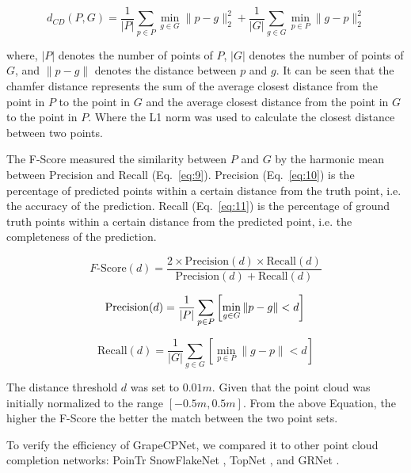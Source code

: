 \documentclass[12pt]{article}
\begin{document}
\begin{equation}
    d_{CD}(P, G) = \frac{1}{|P|} \sum_{p \in P} \min_{g \in G} \|p - g\|_2^2 + \frac{1}{|G|} \sum_{g \in G} \min_{p \in P} \|g - p\|_2^2
    \label{eq:8}
\end{equation}

{\raggedright where, $|P|$ denotes the number of points of $P$, $|G|$ denotes the number of points of $G$, and $\|p - g\|$ denotes the distance between $p$ and $g$. 
It can be seen that the chamfer distance represents the sum of the average closest distance from the point in $P$ to the point in $G$ and the average closest distance from the point in $G$ to the point in $P$. Where the L1 norm was used to calculate the closest distance between two points.}

The F-Score measured the similarity between $P$ and $G$ by the harmonic mean between Precision and Recall (Eq.~\ref{eq:9}). 
Precision (Eq.~\ref{eq:10}) is the percentage of predicted points within a certain distance from the truth point, i.e. the accuracy of the prediction. Recall (Eq.~\ref{eq:11}) is the percentage of ground truth points within a certain distance from the predicted point, i.e. the completeness of the prediction. 

\begin{equation}
    F\text{-Score}(d) = \frac{2 \times \text{Precision}(d) \times \text{Recall}(d)}{\text{Precision}(d) + \text{Recall}(d)} 
\label{eq:9}
\end{equation}


\begin{equation}
    \text{Precision}(d) = \frac{1}{|P|} \sum_{p \in P} \left[ \min_{g \in G} \|p - g\| < d \right]\\
\label{eq:10}
\end{equation}

\begin{equation}
    \text{Recall}(d) = \frac{1}{|G|} \sum_{g \in G} \left[ \min_{p \in P} \|g - p\| < d \right]
\label{eq:11}
\end{equation}

{\raggedright The distance threshold $d$ was set to $0.01m$. Given that the point cloud was initially normalized to the range $[-0.5m, 0.5m]$. 
From the above Equation, the higher the F-Score the better the match between the two point sets.}

To verify the efficiency of GrapeCPNet, we compared it to other point cloud completion networks: PoinTr \citep{yu_pointr_2021} SnowFlakeNet \citep{xiang_snowflakenet_2021}, TopNet \citep{tchapmi_topnet_2019}, and GRNet \citep{xie_grnet_2020}.
\end{document}
